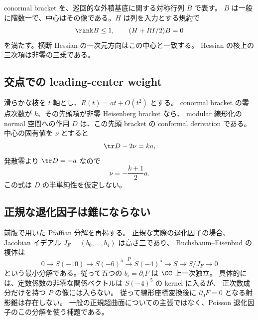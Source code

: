 conormal bracket を、巡回的な外積基底に関する対称行列 $B$ で表す。
$B$ は一般に階数一で、中心はその像である。$H$ は列を入力とする規約で
\begin{equation}\label{eq:e8-center}
 \rank B\le1,\qquad (H+RI/2)B=0
\end{equation}
を満たす。横断 Hessian の一次元方向はこの中心と一致する。
Hessian の核上の三次項は非零の三乗である。

\subsection{交点での leading-center weight}
滑らかな枝を $t$ 軸とし、$R(t)=a t+O(t^2)$ とする。
conormal bracket の零点次数が $k$、その先頭項が非零 Heisenberg bracket なら、
modular 線形化の normal 空間への作用 $D$ は、この先頭 bracket の conformal derivation である。
中心の固有値を $\nu$ とすると
\[
 \tr D-2\nu=ka,
\]
発散零より $\tr D=-a$ なので
\begin{equation}\label{eq:leading-center}
 \boxed{\nu=-\frac{k+1}{2}a.}
\end{equation}
この式は $D$ の半単純性を仮定しない。

\subsection{正規な退化因子は錐にならない}
前版で用いた Pfaffian 分解を再掲する。
正規な実際の退化因子の場合、Jacobian イデアル $J_F=(b_0,\ldots,b_4)$ は高さ三であり、
Buchsbaum--Eisenbud の複体\cite{BE}は
\[
 0\longrightarrow S(-10)\longrightarrow S(-6)^5
 \xrightarrow{P}S(-4)^5\longrightarrow S\longrightarrow S/J_F\longrightarrow0
\]
という最小分解である。従って五つの $b_i=\partial_iF$ は $\CC$ 上一次独立。
具体的には、定数係数の非零な関係ベクトルは $S(-4)^5$ の kernel に入るが、
正次数成分だけを持つ $P$ の像には入らない。
従って線形座標変換後に $\partial_0F=0$ となる射影錐は存在しない。
一般の正規超曲面についての主張ではなく、Poisson 退化因子のこの分解を使う補題である。
